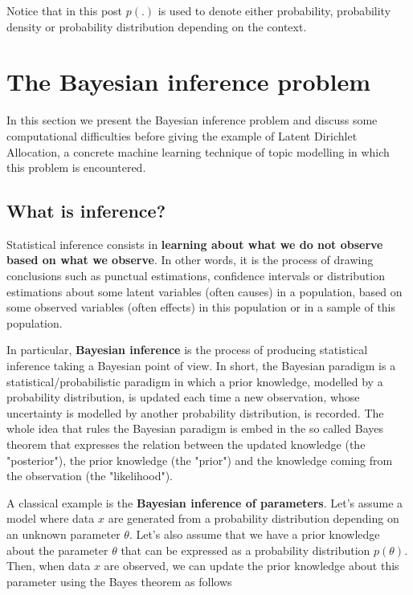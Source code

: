 Notice  that in this post $p(.)$ is used to denote either probability, probability density or probability distribution depending on the context.

\section{The Bayesian inference problem}

In this section we present the Bayesian inference problem and discuss some computational difficulties before giving the example of Latent Dirichlet Allocation, a concrete machine learning technique of topic modelling in which this problem is encountered.

\subsection{What is inference?}

Statistical inference consists in \textbf{learning about what we do not observe based on what we observe}. In other words, it is the process of drawing conclusions such as punctual estimations, confidence intervals or distribution estimations about some latent variables (often causes) in a population, based on some observed variables (often effects) in this population or in a sample of this population.

In particular, \textbf{Bayesian inference} is the process of producing statistical inference taking a Bayesian point of view. In short, the Bayesian paradigm is a statistical/probabilistic paradigm in which a prior knowledge, modelled by a probability distribution, is updated each time a new observation, whose uncertainty is modelled by another probability distribution, is recorded. The whole idea that rules the Bayesian paradigm is embed in the so called Bayes theorem that expresses the relation between the updated knowledge (the "posterior"), the prior knowledge (the "prior") and the knowledge coming from the observation (the "likelihood").

A classical example is the \textbf{Bayesian inference of parameters}. Let's assume a model where data $x$ are generated from a probability distribution depending on an unknown parameter $\theta$. Let's also assume that we have a prior knowledge about the parameter $\theta$ that can be expressed as a probability distribution $p(\theta)$. Then, when data $x$ are observed, we can update the prior knowledge about this parameter using the Bayes theorem as follows


